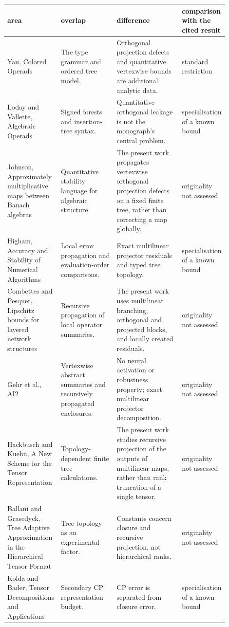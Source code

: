 \begin{tabular}{@{}>{\raggedright\arraybackslash}p{0.17\linewidth}>{\raggedright\arraybackslash}p{0.26\linewidth}>{\raggedright\arraybackslash}p{0.31\linewidth}>{\raggedright\arraybackslash}p{0.16\linewidth}@{}}
\toprule
area & overlap & difference & comparison with the cited result \\
\midrule
Yau, Colored Operads & The type grammar and ordered tree model. & Orthogonal projection defects and quantitative vertexwise bounds are additional analytic data. & standard restriction \\
Loday and Vallette, Algebraic Operads & Signed forests and insertion-tree syntax. & Quantitative orthogonal leakage is not the monograph's central problem. & specialisation of a known bound \\
Johnson, Approximately multiplicative maps between Banach algebras & Quantitative stability language for algebraic structure. & The present work propagates vertexwise orthogonal projection defects on a fixed finite tree, rather than correcting a map globally. & originality not assessed \\
Higham, Accuracy and Stability of Numerical Algorithms & Local error propagation and evaluation-order comparisons. & Exact multilinear projector residuals and typed tree topology. & specialisation of a known bound \\
Combettes and Pesquet, Lipschitz bounds for layered network structures & Recursive propagation of local operator summaries. & The present work uses multilinear branching, orthogonal and projected blocks, and locally created residuals. & originality not assessed \\
Gehr et al., AI2 & Vertexwise abstract summaries and recursively propagated enclosures. & No neural activation or robustness property; exact multilinear projector decomposition. & originality not assessed \\
Hackbusch and Kuehn, A New Scheme for the Tensor Representation & Topology-dependent finite tree calculations. & The present work studies recursive projection of the outputs of multilinear maps, rather than rank truncation of a single tensor. & originality not assessed \\
Ballani and Grasedyck, Tree Adaptive Approximation in the Hierarchical Tensor Format & Tree topology as an experimental factor. & Constants concern closure and recursive projection, not hierarchical ranks. & originality not assessed \\
Kolda and Bader, Tensor Decompositions and Applications & Secondary CP representation budget. & CP error is separated from closure error. & specialisation of a known bound \\

\end{tabular}
